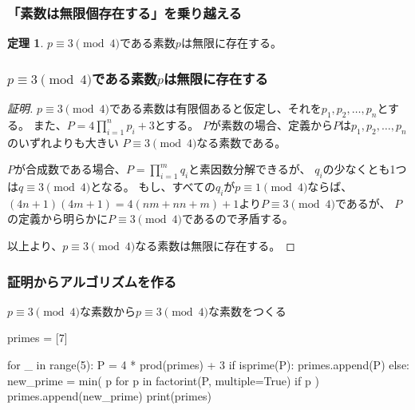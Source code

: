 \documentclass[dvipdfmx,11pt,notheorems]{beamer}
\theoremstyle{definition}
\newtheorem{theorem}{定理}
\begin{document}
\begin{frame}\frametitle{「素数は無限個存在する」を乗り越える}

\begin{theorem}
$p \equiv 3 \pmod{4}$である素数$p$は無限に存在する。
\end{theorem}

\end{frame}

\begin{frame}\frametitle{$p \equiv 3 \pmod{4}$である素数$p$は無限に存在する}


\begin{proof}[証明]

$p \equiv 3 \pmod{4}$である素数は有限個あると仮定し、それを$p_{1}, p_{2}, \dots,  p_{n}$とする。
また、$P = 4\displaystyle \prod^{n}_{i=1}p_{i} + 3$とする。
$P$が素数の場合、定義から$P$は$p_{1}, p_{2}, \dots,  p_{n}$のいずれよりも大きい
$P \equiv 3 \pmod{4}$なる素数である。

$P$が合成数である場合、$P = \displaystyle \prod^{m}_{i=1}q_{i}$と素因数分解できるが、
$q_{i}$の少なくとも1つは$q \equiv 3 \pmod{4}$となる。
もし、すべての$q_{i}$が$p \equiv 1 \pmod{4}$ならば、
$(4n+1)(4m+1)=4(nm + nn + m) + 1$より$P \equiv 3 \pmod{4}$であるが、
$P$の定義から明らかに$P \equiv 3 \pmod{4}$であるので矛盾する。

以上より、$p \equiv 3 \pmod{4}$なる素数は無限に存在する。
\end{proof}

\end{frame}

\begin{frame}[fragile]\frametitle{証明からアルゴリズムを作る}

\begin{block}{$p \equiv 3 \pmod{4}$な素数から$p \equiv 3 \pmod{4}$な素数をつくる}
\begin{pyverbatim}
primes = [7]

for _ in range(5):
    P = 4 * prod(primes) + 3
    if isprime(P):
        primes.append(P)
    else:
        new_prime = min(
            p
            for p in factorint(P, multiple=True)
            if p %
        )
        primes.append(new_prime)
print(primes)
\end{pyverbatim}
\end{block}

\end{frame}
\end{document}
